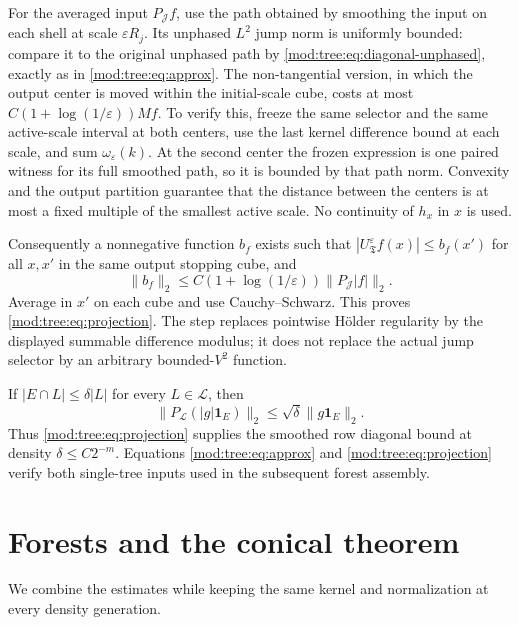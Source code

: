 \documentclass[11pt]{article}
\numberwithin{equation}{section}
\theoremstyle{remark}
\theoremstyle{definition}
\newcommand{\cL}{\mathcal L}
\newcommand{\TT}{\mathfrak T}
\newcommand{\cJ}{\mathcal J}
\begin{document}
For the averaged input $P_{\cJ}f$, use the path obtained by smoothing the
input on each shell at scale $\varepsilon R_j$. Its unphased $L^2$ jump
norm is uniformly bounded: compare it to the original unphased path by
\eqref{mod:tree:eq:diagonal-unphased}, exactly as in
\eqref{mod:tree:eq:approx}. The non-tangential version, in which the output
center is moved within the initial-scale cube, costs at most
$C(1+\log(1/\varepsilon))Mf$. To verify this, freeze the same selector
and the same active-scale interval at both centers, use the last kernel
difference bound at each scale, and sum $\omega_\varepsilon(k)$. At the
second center the frozen expression is one paired witness for its full
smoothed path, so it is bounded by that path norm. Convexity and the
output partition guarantee that the distance between the centers is at
most a fixed multiple of the smallest active scale. No continuity of
$h_x$ in $x$ is used.

Consequently a nonnegative function $b_f$ exists such that
$|U_\TT^\varepsilon f(x)|\le b_f(x')$ for all $x,x'$ in the same output
stopping cube, and
\[
 \|b_f\|_2\le C(1+\log(1/\varepsilon))\|P_{\cJ}|f|\|_2.
\]
Average in $x'$ on each cube and use Cauchy--Schwarz. This proves
\eqref{mod:tree:eq:projection}. The step replaces pointwise Hölder
regularity by the displayed summable difference modulus; it does not
replace the actual jump selector by an arbitrary bounded-$V^2$ function.

If $|E\cap L|\le\delta|L|$ for every $L\in\cL$, then
\[
 \|P_{\cL}(|g|\mathbf1_E)\|_2\le\sqrt\delta\|g\mathbf1_E\|_2.
\]
Thus \eqref{mod:tree:eq:projection} supplies the smoothed row diagonal
bound at density $\delta\le C2^{-m}$. Equations
\eqref{mod:tree:eq:approx} and \eqref{mod:tree:eq:projection} verify both
single-tree inputs used in the subsequent forest assembly.




\section{Forests and the conical theorem}\label{mod:sec-assembly}
We combine the estimates while keeping the same kernel and normalization
at every density generation.
\end{document}
